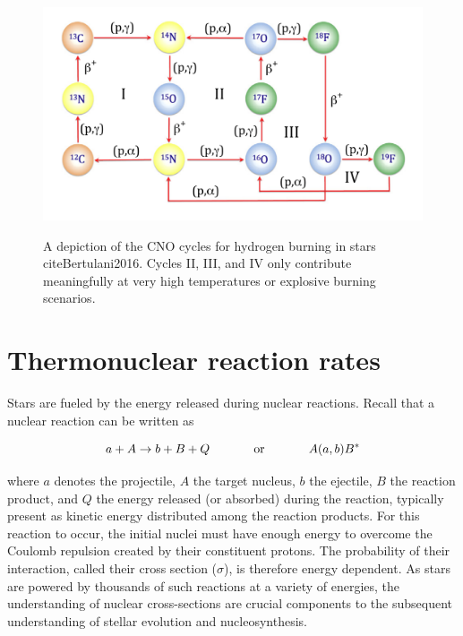 \begin{figure}
\includegraphics[width=\linewidth]{figures/cnoCycles.png}
\label{fig: CNO-cycles}
\caption{A depiction of the CNO cycles for hydrogen burning in stars cite{Bertulani2016}. Cycles II, III, and IV only contribute meaningfully at very high temperatures or explosive burning scenarios. }
\end{figure}




\section{Thermonuclear reaction rates}
\label{sec: thermonuclear reaction rates}

Stars are fueled by the energy released during nuclear reactions. Recall that a nuclear reaction can be written as 

\begin{equation}
a + A \rightarrow b + B + Q \hspace{0.5in} \text{or} \hspace{0.5in} A(a,b)B^{*}
\end{equation}

\noindent where $a$ denotes the projectile, $A$ the target nucleus, $b$ the ejectile, $B$ the reaction product, and $Q$ the energy released (or absorbed) during the reaction, typically present as kinetic energy distributed among the reaction products. For this reaction to occur, the initial nuclei must have enough energy to overcome the Coulomb repulsion created by their constituent protons. The probability of their interaction, called their cross section ($\sigma$), is therefore energy dependent. As stars are powered by thousands of such reactions at a variety of energies, the understanding of nuclear cross-sections are crucial components to the subsequent understanding of stellar evolution and nucleosynthesis. 

